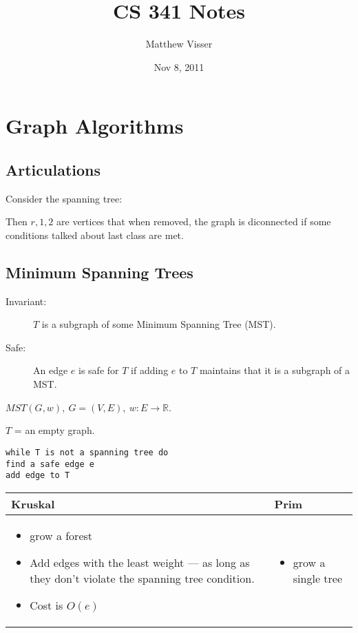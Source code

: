 \documentclass[12pt]{article}
\begin{document}
\title{CS 341 Notes}
\author{Matthew Visser}
\date{Nov  8, 2011}
\maketitle

\newtheorem{thm}{Theorem}

\section{Graph Algorithms}
\subsection{Articulations}

Consider the spanning tree:

Then $r,1,2$ are vertices that when removed, the graph is diconnected if some
conditions talked about last class are met.

\subsection{Minimum Spanning Trees}

\begin{description}
	\item[Invariant:]  $T$ is a subgraph of some Minimum Spanning Tree (MST).
	\item[Safe:] An edge $e$ is safe for $T$ if adding $e$ to $T$ maintains that
		it is a subgraph of a MST.
\end{description}

$MST(G,w),\ G = (V,E),\ w: E \to \mathbb{R}$.

$T$ = an empty graph.

\begin{verbatim}
while T is not a spanning tree do
find a safe edge e
add edge to T
\end{verbatim}

\begin{tabular}{p{}|p{}}
	Kruskal & Prim\\
	\hline
	\begin{itemize}
		\item grow a forest
		\item Add edges with the least weight --- as long as they don't violate
			the spanning tree condition.
		\item Cost is $O(e)$
	\end{itemize}
	& \begin{itemize}
		\item grow a single tree
	\end{itemize}\\
\end{tabular}
\end{document}

